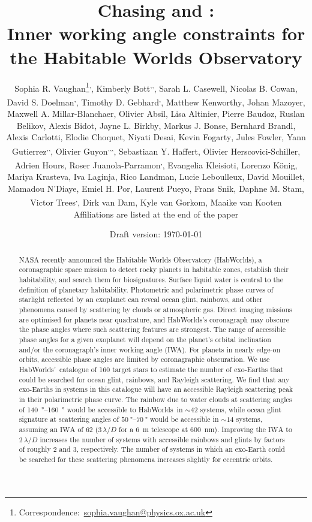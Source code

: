 \documentclass[usenatbib]{mnras}
\title{Chasing \rainbows and \oceanglint:\\ Inner working angle constraints for the Habitable Worlds Observatory}
\author[Sophia R. Vaughan et al.]{%
    Sophia R. Vaughan\thanks{Correspondence:~\url{sophia.vaughan@physics.ox.ac.uk}}\textsuperscript{,\afflink{1}},
    Kimberly Bott\textsuperscript{\afflink{2},\afflink{3},\afflink{4}},
    Sarah L. Casewell\textsuperscript{\afflink{5}},
    Nicolas B. Cowan\textsuperscript{\afflink{6}},
    David S. Doelman\textsuperscript{\afflink{7},\afflink{8}},
    \newauthor
    Timothy D. Gebhard\textsuperscript{\afflink{9},\afflink{10}},
    Matthew Kenworthy\textsuperscript{\afflink{7}},
    Johan Mazoyer\textsuperscript{\afflink{11}},
    Maxwell A. Millar-Blanchaer\textsuperscript{\afflink{12}},
    \newauthor
    Olivier Absil\textsuperscript{\afflink{13}},
    Lisa Altinier\textsuperscript{\afflink{14}},
    Pierre Baudoz\textsuperscript{\afflink{11}},
    Ruslan Belikov\textsuperscript{\afflink{15}},
    Alexis Bidot\textsuperscript{\afflink{16}},
    Jayne L. Birkby\textsuperscript{\afflink{1}},
    \newauthor
    Markus J. Bonse\textsuperscript{\afflink{10}},
    Bernhard Brandl\textsuperscript{\afflink{7}},
    Alexis Carlotti\textsuperscript{\afflink{16}},
    Elodie Choquet\textsuperscript{\afflink{14}},
    Niyati Desai\textsuperscript{\afflink{17}},
    \newauthor
    Kevin Fogarty\textsuperscript{\afflink{15}},
    Jules Fowler\textsuperscript{\afflink{18}},
    Yann Gutierrez\textsuperscript{\afflink{11},\afflink{19},\afflink{20}},
    Olivier Guyon\textsuperscript{\afflink{21},\afflink{22},\afflink{23},\afflink{24}},
    Sebastiaan Y. Haffert\textsuperscript{\afflink{21}},
    \newauthor
    Olivier Herscovici-Schiller\textsuperscript{\afflink{19}},
    Adrien Hours\textsuperscript{\afflink{16}},
    Roser Juanola-Parramon\textsuperscript{\afflink{25},\afflink{26}},
    Evangelia Kleisioti\textsuperscript{\afflink{7}},
    \newauthor
    Lorenzo König\textsuperscript{\afflink{13}},
    Mariya Krasteva\textsuperscript{\afflink{27}},
    Iva Laginja\textsuperscript{\afflink{11}},
    Rico Landman\textsuperscript{\afflink{7}},
    Lucie Leboulleux\textsuperscript{\afflink{16}},
    \newauthor
    David Mouillet\textsuperscript{\afflink{16}},
    Mamadou N’Diaye\textsuperscript{\afflink{28}},
    Emiel H. Por\textsuperscript{\afflink{29}},
    Laurent Pueyo\textsuperscript{\afflink{29}},
    Frans Snik\textsuperscript{\afflink{7}},
    \newauthor
    Daphne M. Stam\textsuperscript{\afflink{30}},
    Victor Trees\textsuperscript{\afflink{31},\afflink{32}},
    Dirk van Dam\textsuperscript{\afflink{7}},
    Kyle van Gorkom\textsuperscript{\afflink{21}},
    Maaike van Kooten\textsuperscript{\afflink{33}}
    \newauthor \\%
    Affiliations are listed at the end of the paper
}
\date{Draft version: \today}
\newcommand{\IWA}{\ensuremath{\mathrm{IWA}}\xspace}
\newcommand{\HWO}{HabWorlds\xspace}
\begin{document}
 

\maketitle

\begin{abstract}
NASA recently announced the Habitable Worlds Observatory (\HWO), a coronagraphic space mission to detect rocky planets in habitable zones, establish their habitability, and search them for biosignatures. 
Surface liquid water is central to the definition of planetary habitability.
%
Photometric and polarimetric phase curves of starlight reflected by an exoplanet can reveal ocean glint, rainbows, and other phenomena caused by scattering by clouds or atmospheric gas.
%
Direct imaging missions are optimised for planets near quadrature, and \HWO's coronagraph may obscure the phase angles where such scattering features are strongest. 
%
The range of accessible phase angles for a given exoplanet will depend on the planet's orbital inclination and/or the coronagraph's inner working angle (IWA). 
%
For planets in nearly edge-on orbits, accessible phase angles are limited by coronagraphic obscuration. 
%
We use \HWO'~catalogue of 160 target stars to estimate the number of exo-Earths that could be searched for ocean glint, rainbows, and Rayleigh scattering. 
%
We find that any exo-Earths in systems in this catalogue will have an accessible Rayleigh scattering peak in their polarimetric phase curve. 
%
The rainbow due to water clouds at scattering angles of \qtyrange{140}{160}{\degree} would be accessible to \HWO\ in $\sim\num{42}$ systems, while ocean glint signature at scattering angles of $\qtyrange{50}{70}{\degree}$ would be accessible in $\sim\num{14}$ systems, assuming an \IWA of \qty{62}{\mas} ($3\,\lambda/D$ for a \qty{6}{\meter} telescope at \qty{600}{\nano\meter}).
%
Improving the \IWA to $2\,\lambda/D$ increases the number of systems with accessible rainbows and glints by factors of roughly 2 and 3, respectively.
%
The number of systems in which an exo-Earth could be searched for these scattering phenomena increases slightly for eccentric orbits.  %
\end{abstract}
\end{document}
